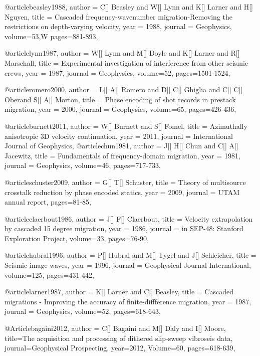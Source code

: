 @article{beasley1988,
  author =	 {C[] Beasley and W[] Lynn and K[] Larner and H[] Nguyen},
  title =	 {Cascaded frequency-wavenumber migration-Removing the restrictions on depth-varying velocity},
  year =	 1988,
  journal =	 {Geophysics},
  volume={53},W
 pages=881-893,
}

@article{lynn1987,
  author =	 {W[] Lynn and M[] Doyle and K[] Larner and R[] Marschall},
  title =	 {Experimental investigation of interference from other seismic crews},
  year =	 1987,
  journal =	 {Geophysics},
  volume={52},
 pages=1501-1524,
}

@article{romero2000,
  author =	 {L[] A[] Romero and D[] C[] Ghiglia and C[] C[] Oberand S[] A[] Morton},
  title =	 {Phase encoding of shot records in prestack migration},
  year =	 2000,
  journal =	 {Geophysics},
  volume={65},
 pages=426-436,
}

@article{burnett2011,
  author =	 {W[] Burnett and S[] Fomel},
  title =	 {Azimuthally anisotropic 3{D} velocity continuation},
  year =	 2011,
  journal =	 {International Journal of Geophysics},
}
@article{chun1981,
  author =	 {J[] H[] Chun and C[] A[] Jacewitz},
  title =	 {Fundamentals of frequency-domain migration},
  year =	 1981,
  journal =	 {Geophysics},
  volume={46},
 pages=717-733,
}

@article{schuster2009,
  author =	 {G[] T[] Schuster},
  title =	 {Theory of multisource crosstalk reduction by phase encoded statics},
  year =	 2009,
  journal =	 {UTAM annual report},
 pages=81-85,
}

@article{claerbout1986,
  author =	 {J[] F[] Claerbout},
  title =	 {Velocity extrapolation by cascaded 15 degree migration},
  year =	 1986,
  journal =	 {in SEP-48: Stanford Exploration Project},
  volume={33},
 pages=76-90,
}

@article{hubral1996,
  author =	 {P[] Hubral and M[] Tygel and J[] Schleicher},
  title =	 {Seismic image waves},
  year =	 1996,
  journal =	 {Geophysical Journal International},
  volume={125},
 pages=431-442,
}

@article{larner1987,
  author =	 {K[] Larner and C[] Beasley},
  title =	 {Cascaded migrations - Improving the accuracy of finite-diffference migration},
  year =	 1987,
  journal =	 {Geophysics},
  volume={52},
 pages=618-643,
}

@Article{bagaini2012,
  author = {C[] Bagaini and M[] Daly and I[] Moore},
  title={The acquisition and processing of dithered slip-sweep vibroseis data},
  journal={Geophysical Prospecting},
  year=2012,
  Volume=60,
  pages={618-639},
}


